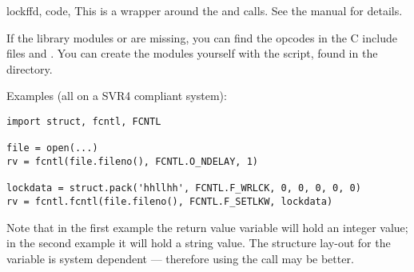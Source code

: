 \begin{funcdesc}{lockf}{fd, code, }
This is a wrapper around the  and
  calls.  See the \UNIX{}
manual for details.
\end{funcdesc}

If the library modules  or
 are missing, you can find the
opcodes in the C include files  and
.  You can create the modules yourself with the
 script, found in the  directory.


Examples (all on a SVR4 compliant system):

\begin{verbatim}
import struct, fcntl, FCNTL

file = open(...)
rv = fcntl(file.fileno(), FCNTL.O_NDELAY, 1)

lockdata = struct.pack('hhllhh', FCNTL.F_WRLCK, 0, 0, 0, 0, 0)
rv = fcntl.fcntl(file.fileno(), FCNTL.F_SETLKW, lockdata)
\end{verbatim}

Note that in the first example the return value variable  will
hold an integer value; in the second example it will hold a string
value.  The structure lay-out for the  variable is
system dependent --- therefore using the  call may be
better.
